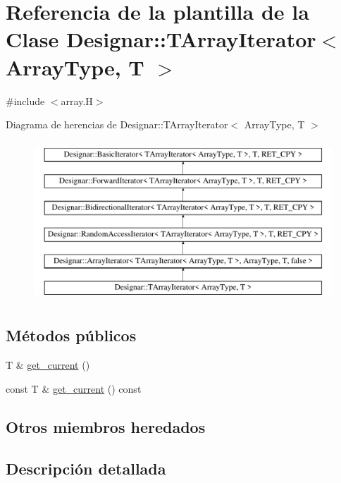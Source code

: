 \hypertarget{class_designar_1_1_t_array_iterator}{}\section{Referencia de la plantilla de la Clase Designar\+:\+:T\+Array\+Iterator$<$ Array\+Type, T $>$}
\label{class_designar_1_1_t_array_iterator}


{\ttfamily \#include $<$array.\+H$>$}

Diagrama de herencias de Designar\+:\+:T\+Array\+Iterator$<$ Array\+Type, T $>$\begin{figure}[H]
\begin{center}
\leavevmode
\includegraphics[height=6.000000cm]{class_designar_1_1_t_array_iterator}
\end{center}
\end{figure}
\subsection*{Métodos públicos}
\begin{DoxyCompactItemize}
\item 
T \& \hyperlink{class_designar_1_1_t_array_iterator_a1d627df3d5e97047d904e743ccab0731}{get\+\_\+current} ()
\item 
const T \& \hyperlink{class_designar_1_1_t_array_iterator_ab7f3127bd70958a362a18f91a199a72b}{get\+\_\+current} () const
\end{DoxyCompactItemize}
\subsection*{Otros miembros heredados}


\subsection{Descripción detallada}
